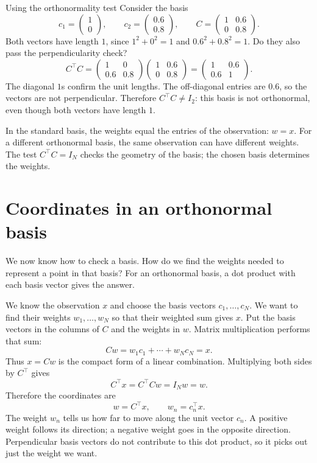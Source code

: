 \documentclass[a4paper,12pt,oneside]{report}
\begin{document}
\begin{framedexample}{Using the orthonormality test}
Consider the basis
\[
  c_1=\begin{pmatrix}1\\0\end{pmatrix},\qquad
  c_2=\begin{pmatrix}0.6\\0.8\end{pmatrix},\qquad
  C=\begin{pmatrix}1&0.6\\0&0.8\end{pmatrix}.
\]
Both vectors have length $1$, since $1^2+0^2=1$ and
$0.6^2+0.8^2=1$. Do they also pass the perpendicularity check?
\[
  C^\top C
  =\begin{pmatrix}
     1&0\\0.6&0.8
   \end{pmatrix}
   \begin{pmatrix}1&0.6\\0&0.8\end{pmatrix}
  =\begin{pmatrix}1&0.6\\0.6&1\end{pmatrix}.
\]
The diagonal $1$s confirm the unit lengths. The off-diagonal entries
are $0.6$, so the vectors are not perpendicular. Therefore
$C^\top C\ne I_2$: this basis is not orthonormal, even though both
vectors have length $1$.
\end{framedexample}

In the standard basis, the weights equal the entries of the observation:
$w=x$. For a different orthonormal basis, the same observation can have
different weights. The test $C^\top C=I_N$ checks the geometry of the
basis; the chosen basis determines the weights.

\clearpage
\section{Coordinates in an orthonormal basis}

We now know how to check a basis. How do we find the weights needed to
represent a point in that basis? For an orthonormal basis, a dot product
with each basis vector gives the answer.

We know the observation $x$ and choose the basis vectors
$c_1,\ldots,c_N$. We want to find their weights $w_1,\ldots,w_N$ so that
their weighted sum gives $x$. Put the basis vectors in the columns of
$C$ and the weights in $w$. Matrix multiplication performs that sum:
\[
  Cw=w_1c_1+\cdots+w_Nc_N=x.
\]
Thus $x=Cw$ is the compact form of a linear combination. Multiplying
both sides by $C^\top$ gives
\[
  C^\top x=C^\top Cw=I_Nw=w.
\]
Therefore the coordinates are
\[
  \boxed{w=C^\top x,\qquad w_n=c_n^\top x.}
\]
The weight $w_n$ tells us how far to move along the unit vector $c_n$.
A positive weight follows its direction; a negative weight goes in the
opposite direction. Perpendicular basis vectors do not contribute to
this dot product, so it picks out just the weight we want.
\end{document}
